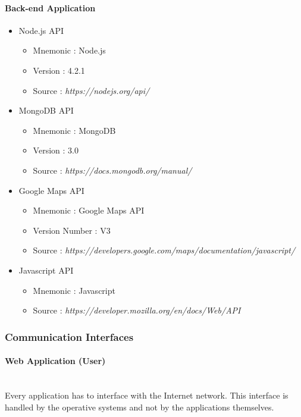 \documentclass[12pt, a4paper]{article}
\begin{document}
\paragraph{Back-end Application} 

\begin{itemize}
	\item Node.js API
	\begin{itemize}
		\item Mnemonic : Node.js
		\item Version : 4.2.1
		\item Source : \emph{https://nodejs.org/api/}
	\end{itemize}

	\item MongoDB API
	\begin{itemize}
		\item Mnemonic : MongoDB
		\item Version : 3.0
		\item Source : \emph{https://docs.mongodb.org/manual/}
	\end{itemize}

	\item Google Maps API
	\begin{itemize}
		\item Mnemonic : Google Maps API
		\item Version Number : V3
		\item Source : \emph{https://developers.google.com/maps/documentation/javascript/}
	\end{itemize}
	\item Javascript API
	\begin{itemize}
		\item Mnemonic : Javascript
		\item Source : \emph{https://developer.mozilla.org/en/docs/Web/API} 
	\end{itemize}
\end{itemize}

\subsubsection{Communication Interfaces} 
\label{ssub:communication_interfaces}
\paragraph{Web Application (User)}\mbox{} \\
Every application has to interface with the Internet network. This interface is handled by the operative systems and not by the applications themselves.
\end{document}
